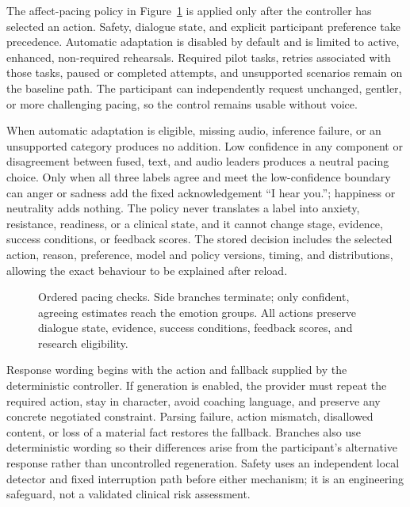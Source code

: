 The affect-pacing policy in Figure~\ref{fig:affect-policy} is applied only after the controller has selected an action. Safety, dialogue state, and explicit participant preference take precedence. Automatic adaptation is disabled by default and is limited to active, enhanced, non-required rehearsals. Required pilot tasks, retries associated with those tasks, paused or completed attempts, and unsupported scenarios remain on the baseline path. The participant can independently request unchanged, gentler, or more challenging pacing, so the control remains usable without voice.

When automatic adaptation is eligible, missing audio, inference failure, or an unsupported category produces no addition. Low confidence in any component or disagreement between fused, text, and audio leaders produces a neutral pacing choice. Only when all three labels agree and meet the low-confidence boundary can anger or sadness add the fixed acknowledgement ``I hear you.''; happiness or neutrality adds nothing. The policy never translates a label into anxiety, resistance, readiness, or a clinical state, and it cannot change stage, evidence, success conditions, or feedback scores. The stored decision includes the selected action, reason, preference, model and policy versions, timing, and distributions, allowing the exact behaviour to be explained after reload.
\label{subsec:affect-pacing}

\begin{figure}[htbp]
\centering

\caption[Ordered checks for bounded affect-aware pacing.]{Ordered pacing checks. Side branches terminate; only confident, agreeing estimates reach the emotion groups. All actions preserve dialogue state, evidence, success conditions, feedback scores, and research eligibility.}
\label{fig:affect-policy}
\end{figure}

Response wording begins with the action and fallback supplied by the deterministic controller. If generation is enabled, the provider must repeat the required action, stay in character, avoid coaching language, and preserve any concrete negotiated constraint. Parsing failure, action mismatch, disallowed content, or loss of a material fact restores the fallback. Branches also use deterministic wording so their differences arise from the participant's alternative response rather than uncontrolled regeneration. Safety uses an independent local detector and fixed interruption path before either mechanism; it is an engineering safeguard, not a validated clinical risk assessment.
\label{subsec:response-realisation}

